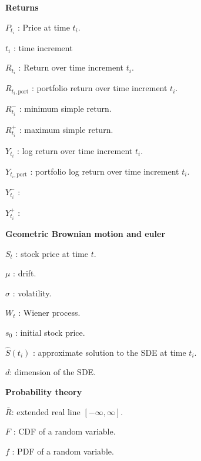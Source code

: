 


\begin{generalinstructions}
    \begin{compactitem}
        \item \textbf{Returns}
        \item $P_{t_i}$ : Price at time $t_i$. 
        \item $t_i$ : time increment
        \item $R_{t_i}$ : Return over time increment $t_i$.
        \item $R_{t_i,\mathrm{port}}$ : portfolio return over time increment $t_i$.
        \item $R_{t_i}^-$ : minimum simple return.
        \item $R_{t_i}^+$ : maximum simple return.
        \item $Y_{t_i}$ : log return over time increment $t_i$.
        \item $Y_{t_i, \mathrm{port}}$  : portfolio log return over time increment $t_i$.
        \item $Y_{t_i}^-$ :
        \item $Y_{t_i}^+$ :
        \item \textbf{Geometric Brownian motion and euler} 
        \item $S_t$ : stock price at time $t$.
        \item $\mu$ : drift.    
        \item $\sigma$ : volatility.
        \item $W_t$ : Wiener process.
        \item $s_0$ : initial stock price.
        \item $\hat{S}(t_i)$ : approximate solution to the \gls{SDE} at time $t_i$.
        \item $d$: dimension of the \gls{SDE}.
        \item \textbf{Probability theory}
        \item $\bar{R}$: extended real line $[-\infty, \infty]$.
        \item $F$ : \gls{CDF} of a random variable.
        \item $f$ : \gls{PDF} of a random variable.

\end{compactitem}
\end{generalinstructions}

